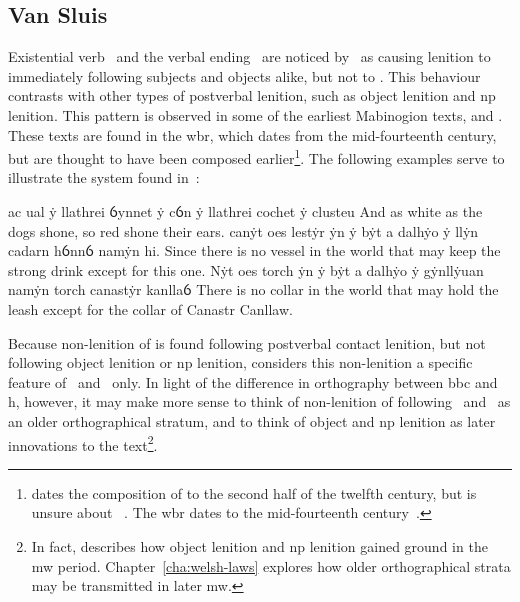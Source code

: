 \subsection{Van Sluis}
\label{sec:van-sluis}
Existential verb \oes\ and the verbal ending \ei\ are noticed by~\textcite{van_development14} as causing lenition to immediately following subjects and objects alike, but not to . This behaviour contrasts with other types of postverbal lenition, such as object lenition and \gls{np} lenition. This pattern is observed in some of the earliest Mabinogion texts, \ie {} and . These texts are found in the \gls{wbr}, which dates from the mid-fourteenth century, but are thought to have been composed earlier\footnote{\Textcite[43]{rodway_date_2005} dates the composition of  to the second half of the twelfth century, but is unsure about ~\autocite[59]{Rod_Where07}. The \gls{wbr} dates to the mid-fourteenth century~\autocite[59]{huws_medieval_2000}.}. The following examples serve to illustrate the system found in~\textcite{van_development14}:
\begin{mwl}
  {ac ual ẏ llathrei ỽynnet ẏ cỽn ẏ llathrei cochet ẏ clusteu}%
  {And as white as the dogs shone, so red shone their ears.}%
  {canẏt oes lestẏr ẏn ẏ bẏt a dalhẏo ẏ llẏn cadarn hỽnnỽ namẏn hi.}%
  {Since there is no vessel in the world that may keep the strong drink except for this one.}%
  {Nẏt oes torch ẏn ẏ bẏt a dalhẏo ẏ gẏnllẏuan namẏn torch canastẏr kanllaỽ}%
  {There is no collar in the world that may hold the leash except for the collar of Canastr Canllaw.}%
\end{mwl}
Because non-lenition of  is found following postverbal contact lenition, but not following object lenition or \gls{np} lenition, \textcite{van_development14} considers this non-lenition a specific feature of \ei\ and \oes\ only. In light of the difference in orthography between \gls{bbc} and \gls{h}, however, it may make more sense to think of non-lenition of  following \ei\ and \oes\ as an older orthographical stratum, and to think of object and \gls{np} lenition as later innovations to the text\footnote{In fact, \textcite{van_development14} describes how object lenition and \gls{np} lenition gained ground in the \gls{mw} period. Chapter~\ref{cha:welsh-laws} explores how older orthographical strata may be transmitted in later \gls{mw}.}.

